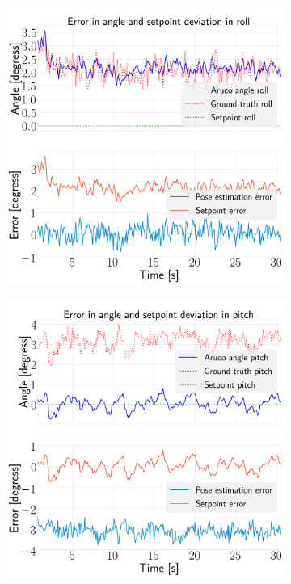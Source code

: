 \documentclass[../Head/report.tex]{subfiles}
\begin{document}
\begin{figure}[H]
    \centering
    \begin{subfigure}[t]{.30\textwidth}
        \centering
        \includegraphics[width=\textwidth]{../Figures/optitrack/hold_pose_using_estimated_aruco_pose/pose_error_roll_test5.png}
        \caption{}
        \label{fig:optitrack_hold_pose_using_estimated_aruco_pose_error_roll_test_five}
    \end{subfigure}
     \hspace{0.2em}
    \begin{subfigure}[t]{.30\textwidth}
        \centering
        \includegraphics[width=\textwidth]{../Figures/optitrack/hold_pose_using_estimated_aruco_pose/pose_error_pitch_test5.png}

\end{subfigure}
\end{figure}
\end{document}
